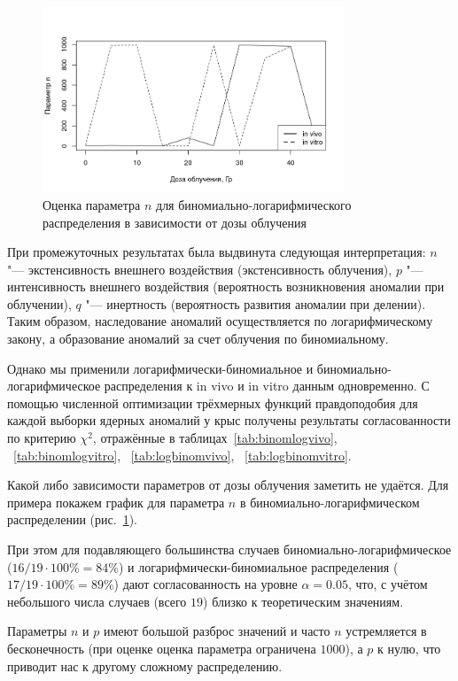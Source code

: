 \documentclass[12pt, specialist, subf, substylefile = spbu_report.rtx]{disser}
\begin{document}
	\begin{figure}[!ht]
		\centering
		\includegraphics[width = 0.8\textwidth]{logbinomn}
		\caption{Оценка параметра $n$ для биномиально-логарифмического распределения в зависимости от дозы облучения}
		\label{img:logbinomn}
	\end{figure}
	
	При промежуточных результатах была выдвинута следующая интерпретация: $ n $ "--- экстенсивность внешнего воздействия (экстенсивность облучения), $ p $ "--- интенсивность внешнего воздействия (вероятность возникновения аномалии при облучении), $ q $ "--- инертность (вероятность развития аномалии при делении). Таким образом, наследование аномалий осуществляется по логарифмическому закону, а образование аномалий за счет облучения  по биномиальному.
	
	Однако мы применили логарифмически-биномиальное и биномиально-логарифмическое распределения к in vivo и in vitro данным одновременно. С помощью численной оптимизации трёхмерных функций правдоподобия для каждой выборки ядерных аномалий у крыс получены результаты согласованности по критерию $ \chi ^2 $, отражённые в таблицах~\ref{tab:binomlogvivo}, ~\ref{tab:binomlogvitro}, ~\ref{tab:logbinomvivo}, ~\ref{tab:logbinomvitro}.
	
	Какой либо зависимости параметров от дозы облучения заметить не удаётся. Для примера покажем график для параметра $n$ в биномиально-логарифмическом распределении (рис.~\ref{img:logbinomn}).
	
	При этом для подавляющего большинства случаев биномиально-логарифмическое ($16 / 19 \cdot 100\% = 84\%$) и логарифмически-биномиальное распределения ($17 / 19 \cdot 100\% = 89\%$) дают согласованность на уровне $\alpha = 0.05$, что, с учётом небольшого числа случаев (всего $19$) близко к теоретическим значениям.
	
	Параметры $n$ и $p$ имеют большой разброс значений и часто $n$ устремляется в бесконечность (при оценке оценка параметра ограничена $1000$), а $p$ к нулю, что приводит нас к другому сложному распределению.
	
\end{document}
